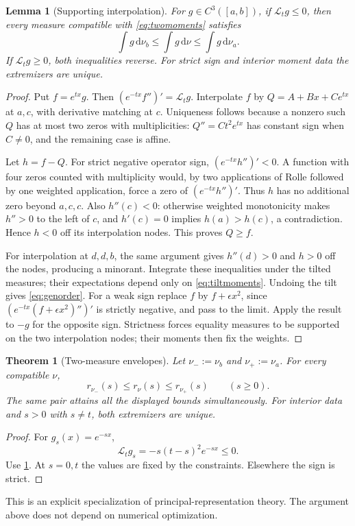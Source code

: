 \documentclass[11pt]{article}
\numberwithin{equation}{section}
\newtheorem{theorem}{Theorem}[section]
\newtheorem{lemma}[lemma]{Lemma}
\theoremstyle{definition}
\theoremstyle{remark}
\newcommand{\dd}{\,\mathrm d}
\begin{document}
\begin{lemma}[Supporting interpolation]\label{lem:interpolation}
For $g\in C^3([a,b])$, if $\mathcal L_tg\le0$, then every measure compatible with \eqref{eq:twomoments} satisfies
\begin{equation}\label{eq:genorder}
 \int g\dd\nu_b\le\int g\dd\nu\le\int g\dd\nu_a.
\end{equation}
If $\mathcal L_tg\ge0$, both inequalities reverse. For strict sign and interior moment data the extremizers are unique.
\end{lemma}
\begin{proof}
Put $f=e^{tx}g$. Then $(e^{-tx}f'')'=\mathcal L_tg$. Interpolate $f$ by $Q=A+Bx+Ce^{tx}$ at $a,c$, with derivative matching at $c$. Uniqueness follows because a nonzero such $Q$ has at most two zeros with multiplicities: $Q''=Ct^2e^{tx}$ has constant sign when $C\ne0$, and the remaining case is affine.

Let $h=f-Q$. For strict negative operator sign, $(e^{-tx}h'')'<0$. A function with four zeros counted with multiplicity would, by two applications of Rolle followed by one weighted application, force a zero of $(e^{-tx}h'')'$. Thus $h$ has no additional zero beyond $a,c,c$. Also $h''(c)<0$: otherwise weighted monotonicity makes $h''>0$ to the left of $c$, and $h'(c)=0$ implies $h(a)>h(c)$, a contradiction. Hence $h<0$ off its interpolation nodes. This proves $Q\ge f$.

For interpolation at $d,d,b$, the same argument gives $h''(d)>0$ and $h>0$ off the nodes, producing a minorant. Integrate these inequalities under the tilted measures; their expectations depend only on \eqref{eq:tiltmoments}. Undoing the tilt gives \eqref{eq:genorder}. For a weak sign replace $f$ by $f+\epsilon x^2$, since $(e^{-tx}(f+\epsilon x^2)'')'$ is strictly negative, and pass to the limit. Apply the result to $-g$ for the opposite sign. Strictness forces equality measures to be supported on the two interpolation nodes; their moments then fix the weights.
\end{proof}

\begin{theorem}[Two-measure envelopes]\label{thm:twonode}
Let $\nu_-:=\nu_b$ and $\nu_+:=\nu_a$. For every compatible $\nu$,
\begin{equation}\label{eq:rateenvelope}
 r_{\nu_-}(s)\le r_\nu(s)\le r_{\nu_+}(s)\qquad(s\ge0).
\end{equation}
The same pair attains all the displayed bounds simultaneously. For interior data and $s>0$ with $s\ne t$, both extremizers are unique.
\end{theorem}
\begin{proof}
For $g_s(x)=e^{-sx}$,
\begin{equation}\label{eq:ratesign}
 \mathcal L_tg_s=-s(t-s)^2e^{-sx}\le0.
\end{equation}
Use \cref{lem:interpolation}. At $s=0,t$ the values are fixed by the constraints. Elsewhere the sign is strict.
\end{proof}
This is an explicit specialization of principal-representation theory. The argument above does not depend on numerical optimization.
\end{document}
